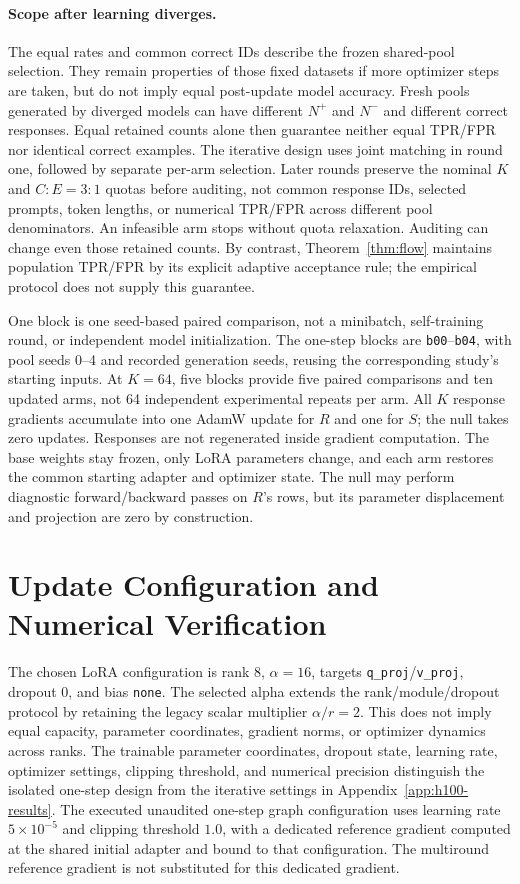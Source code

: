 \paragraph{Scope after learning diverges.}
The equal rates and common correct IDs describe the frozen shared-pool
selection. They remain properties of those fixed datasets if more optimizer
steps are taken, but do not imply equal post-update model accuracy.
Fresh pools generated by diverged models can have different $N^+$ and
$N^-$ and different correct responses. Equal retained counts alone then
guarantee neither equal TPR/FPR nor identical correct examples.
The iterative design uses joint matching in round one, followed by
separate per-arm selection. Later rounds
preserve the nominal $K$ and $C:E=3:1$ quotas before auditing, not common
response IDs, selected prompts, token lengths, or numerical TPR/FPR across
different pool denominators. An infeasible arm stops without quota relaxation.
Auditing can change even those retained counts. By contrast,
Theorem~\ref{thm:flow} maintains population TPR/FPR by its explicit
adaptive acceptance rule; the empirical protocol does not supply this guarantee.

One block is one seed-based paired comparison, not a minibatch,
self-training round, or independent model initialization. The one-step
blocks are \texttt{b00}--\texttt{b04}, with pool seeds 0--4 and recorded
generation seeds, reusing the corresponding study's starting inputs.
At $K=64$, five blocks provide five paired comparisons and ten updated
arms, not 64 independent experimental repeats per arm. All $K$ response
gradients accumulate into one AdamW update for $R$ and one for $S$; the
null takes zero updates. Responses are not regenerated inside gradient
computation. The base weights stay frozen, only LoRA parameters change,
and each arm restores the common starting adapter and optimizer state.
The null may perform diagnostic forward/backward passes on $R$'s rows,
but its parameter displacement and projection are zero by construction.

\section{Update Configuration and Numerical Verification}
\label{app:update}

The chosen LoRA configuration is rank $8$, $\alpha=16$, targets
\texttt{q\_proj}/\texttt{v\_proj}, dropout $0$, and bias \texttt{none}.
The selected alpha extends the rank/module/dropout protocol by retaining the
legacy scalar multiplier $\alpha/r=2$. This does not imply equal capacity,
parameter coordinates, gradient norms, or optimizer dynamics across ranks.
The trainable parameter coordinates, dropout state, learning rate,
optimizer settings, clipping threshold, and numerical precision distinguish
the isolated one-step design from the iterative settings in
Appendix~\ref{app:h100-results}.
The executed unaudited one-step graph configuration uses learning rate
$5\times10^{-5}$ and clipping threshold $1.0$, with a dedicated reference
gradient computed at the shared initial adapter and bound to that configuration.
The multiround reference gradient is not substituted for this dedicated gradient.

